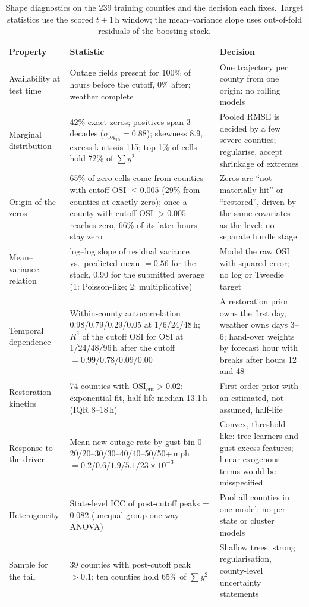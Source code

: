 \documentclass[10pt]{article}
\newcommand{\osi}{\mathrm{OSI}}
\begin{document}
\begin{table}[tb]\centering\scriptsize
\caption{Shape diagnostics on the 239 training counties and the decision each fixes. Target statistics use the scored $t{+}1$\,h window; the mean--variance slope uses out-of-fold residuals of the boosting stack.}\label{tab:shape}
\begin{tabular}{@{}p{2.5cm}p{7.6cm}p{7.1cm}@{}}\toprule
Property & Statistic & Decision \\ \midrule
Availability at test time & Outage fields present for 100\% of hours before the cutoff, 0\% after; weather complete & One trajectory per county from one origin; no rolling models\\
Marginal distribution & 42\% exact zeros; positives span 3 decades ($\sigma_{\log_{10}}=0.88$); skewness 8.9, excess kurtosis 115; top 1\% of cells hold 72\% of $\sum y^2$ & Pooled RMSE is decided by a few severe counties; regularise, accept shrinkage of extremes\\
Origin of the zeros & 65\% of zero cells come from counties with cutoff OSI $\le0.005$ (29\% from counties at exactly zero); once a county with cutoff OSI $>0.005$ reaches zero, 66\% of its later hours stay zero & Zeros are ``not materially hit'' or ``restored'', driven by the same covariates as the level: no separate hurdle stage\\
Mean--variance relation & log--log slope of residual variance vs.\ predicted mean $=0.56$ for the stack, 0.90 for the submitted average (1: Poisson-like; 2: multiplicative) & Model the raw OSI with squared error; no log or Tweedie target\\
Temporal dependence & Within-county autocorrelation 0.98/0.79/0.29/0.05 at 1/6/24/48\,h; $R^2$ of the cutoff OSI for OSI at 1/24/48/96\,h after the cutoff $=0.99/0.78/0.09/0.00$ & A restoration prior owns the first day, weather owns days 3--6; hand-over weights by forecast hour with breaks after hours 12 and 48\\
Restoration kinetics & 74 counties with $\osi_{\mathrm{cut}}>0.02$: exponential fit, half-life median 13.1\,h (IQR 8--18\,h) & First-order prior with an estimated, not assumed, half-life\\
Response to the driver & Mean new-outage rate by gust bin 0--20/20--30/30--40/40--50/50+\,mph $=0.2/0.6/1.9/5.1/23\times10^{-3}$ & Convex, threshold-like: tree learners and gust-excess features; linear exogenous terms would be misspecified\\
Heterogeneity & State-level ICC of post-cutoff peaks = 0.082 (unequal-group one-way ANOVA) & Pool all counties in one model; no per-state or cluster models\\
Sample for the tail & 39 counties with post-cutoff peak $>0.1$; ten counties hold 65\% of $\sum y^2$ & Shallow trees, strong regularisation, county-level uncertainty statements\\
\bottomrule\end{tabular}\end{table}
\end{document}
